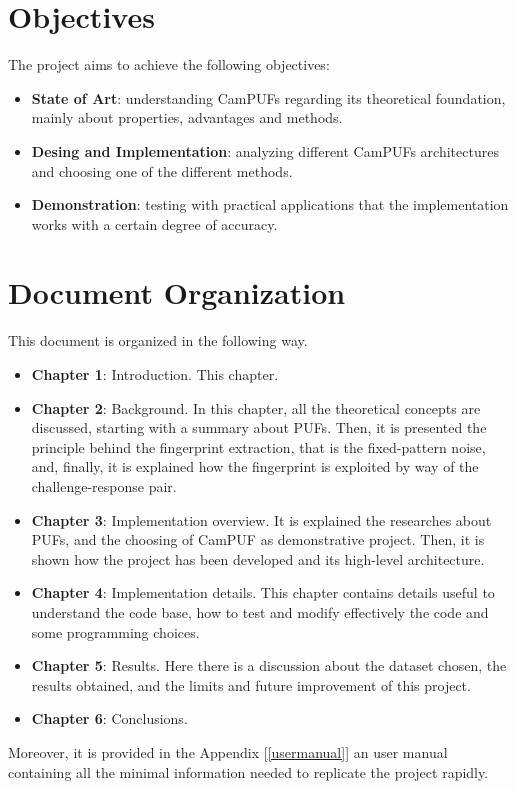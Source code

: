 \section {Objectives}
The project aims to achieve the following objectives:
\begin{itemize}
    \item \textbf{State of Art}: understanding CamPUFs regarding its theoretical foundation, mainly about properties, advantages and methods.
    

    \item \textbf{Desing and Implementation}: analyzing different CamPUFs architectures and choosing one of the different methods.
    
    
    \item \textbf{Demonstration}: testing with practical applications that the implementation works with a certain degree of accuracy.

\end{itemize}

\section {Document Organization}
This document is organized in the following way.
\begin{itemize}
\item \textbf{Chapter 1}: Introduction. This chapter.
\item \textbf{Chapter 2}: Background. In this chapter, all the theoretical concepts are discussed, starting with a summary about PUFs. Then, it is presented the principle behind the fingerprint extraction, that is the fixed-pattern noise, and, finally, it is explained how the fingerprint is exploited by way of the challenge-response pair.
\item \textbf{Chapter 3}: Implementation overview. It is explained the researches about PUFs, and the choosing of CamPUF as demonstrative project. Then, it is shown how the project has been developed and its high-level architecture.
\item \textbf{Chapter 4}: Implementation details. This chapter contains details useful to understand the code base, how to test and modify effectively the code and some programming choices.
\item \textbf{Chapter 5}: Results. Here there is a discussion about the dataset chosen, the results obtained, and the limits and future improvement of this project.
\item \textbf{Chapter 6}: Conclusions.
\end{itemize}
Moreover, it is provided in the Appendix [\ref{usermanual}] an user manual containing all the minimal information needed to replicate the project rapidly.
